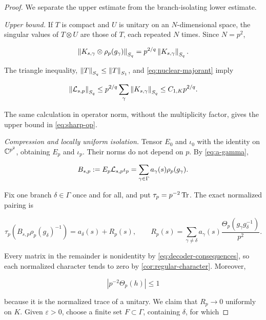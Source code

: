 \begin{proof}
We separate the upper estimate from the branch-isolating lower estimate.

\emph{Upper bound.}
If \(T\) is compact and \(U\) is unitary on an \(N\)-dimensional space,
the singular values of \(T\otimes U\) are those of \(T\), each repeated
\(N\) times.  Since \(N=p^2\),

\begin{equation}
 \left\lVert K_{s,\gamma}\otimes\rho_p(g_\gamma)\right\rVert_{S_{q}}
 =p^{2/q}\left\lVert K_{s,\gamma}\right\rVert_{S_{q}}.
 \label{eq:tensor-schatten}
\end{equation}

The triangle inequality, \(\left\lVert T\right\rVert_{S_{q}}\le
\left\lVert T\right\rVert_{S_{1}}\), and \cref{eq:nuclear-majorant} imply

\[
 \left\lVert\mathcal L_{s,p}\right\rVert_{S_{q}}
 \le p^{2/q}\sum_\gamma\left\lVert K_{s,\gamma}\right\rVert_{S_{q}}
 \le C_{1,K}p^{2/q}.
\]

The same calculation in operator norm, without the multiplicity factor,
gives the upper bound in \cref{eq:sharp-op}.

\emph{Compression and locally uniform isolation.}
Tensor \(E_0\) and \(\iota_0\) with the identity on \(\mathbb C^{p^2}\), obtaining
\(E_p\) and \(\iota_p\).  Their norms do not depend on \(p\).  By
\cref{eq:a-gamma},

\begin{equation}
 B_{s,p}:=E_p\mathcal L_{s,p}\iota_p
 =\sum_{\gamma\in\Gamma}a_\gamma(s)\rho_p(g_\gamma).
 \label{eq:compressed-B}
\end{equation}

Fix one branch \(\delta\in\Gamma\) once and for all, and put
\(\tau_p=p^{-2}\operatorname{Tr}\).  The exact normalized pairing is

\begin{equation}
 \tau_p\!\left(B_{s,p}\rho_p(g_\delta)^{-1}\right)
 =a_\delta(s)+R_p(s),
 \qquad
 R_p(s)=\sum_{\gamma\ne\delta}a_\gamma(s)
 \frac{\Theta_p(g_\gamma g_\delta^{-1})}{p^2}.
 \label{eq:isolation}
\end{equation}

Every matrix in the remainder is nonidentity by
\cref{eq:decoder-consequences}, so each normalized character tends to zero
by \cref{cor:regular-character}.  Moreover,

\[
 \left|p^{-2}\Theta_p(h)\right|\le1
\]

because it is the normalized trace of a unitary.  We claim that
\(R_p\to0\) uniformly on \(K\).  Given \(\varepsilon>0\), choose a finite
set \(F\subset\Gamma\), containing \(\delta\), for which


\end{proof}
